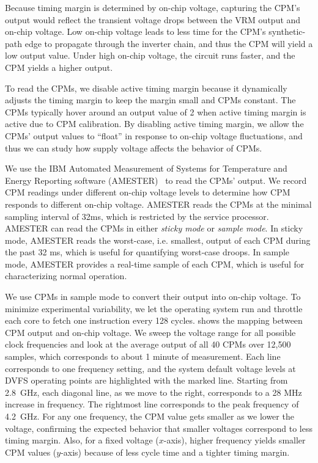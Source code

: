 Because timing margin is determined by on-chip voltage, capturing the CPM's output would reflect the transient voltage drops between the VRM output and on-chip voltage. Low on-chip voltage leads to less time for the CPM's synthetic-path edge to propagate through the inverter chain, and thus the CPM will yield a low output value. Under high on-chip voltage, the circuit runs faster, and the CPM yields a higher output.

To read the CPMs, we disable active timing margin because it dynamically adjusts the timing margin to keep the margin small and CPMs constant. The CPMs typically hover around an output value of 2 when active timing margin is active due to CPM calibration. By disabling active timing margin, we allow the CPMs' output values to ``float'' in response to on-chip voltage fluctuations, and thus we can study how supply voltage affects the behavior of CPMs. 

We use the IBM Automated Measurement of Systems for Temperature and Energy Reporting software (AMESTER)~\cite{floyd2011introducing} to read the CPMs' output. We record CPM readings under different on-chip voltage levels to determine how CPM responds to different on-chip voltage. AMESTER reads the CPMs at the minimal sampling interval of 32ms, which is restricted by the service processor. AMESTER can read the CPMs in either {\it sticky mode} or {\it sample mode}. In sticky mode, AMESTER reads the worst-case, i.e. smallest, output of each CPM during the past 32 ms, which is useful for quantifying worst-case droops. In sample mode, AMESTER provides a real-time sample of each CPM, which is useful for characterizing normal operation.

We use CPMs in sample mode to convert their output into on-chip voltage. To minimize experimental variability, we let the operating system run and throttle each core to fetch one instruction every 128 cycles.  shows the mapping between CPM output and on-chip voltage. We sweep the voltage range for all possible clock frequencies and look at the average output of all 40 CPMs over 12,500 samples, which corresponds to about 1 minute of measurement. Each line corresponds to one frequency setting, and the system default voltage levels at DVFS operating points are highlighted with the marked line. Starting from 2.8~GHz, each diagonal line, as we move to the right, corresponds to a 28 MHz increase in frequency. The rightmost line corresponds to the peak frequency of 4.2~GHz. For any one frequency, the CPM value gets smaller as we lower the voltage, confirming the expected behavior that smaller voltages correspond to less timing margin. Also, for a fixed voltage ($x$-axis), higher frequency yields smaller CPM values ($y$-axis) because of less cycle time and a tighter timing margin. 

